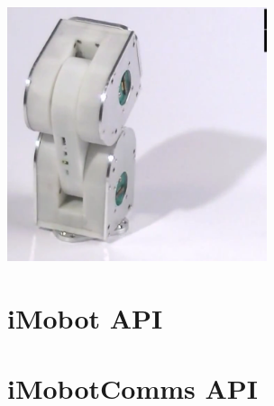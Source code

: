 \documentclass[11pt]{report}
\begin{document}
\begin{itemize}
\includegraphics[width=3in]{images/stand4.png}
\end{itemize}

\appendix
\chapter{iMobot API}

\pagebreak

\chapter{iMobotComms API}


{}
\printindex
\end{document}
